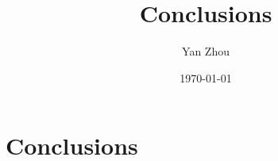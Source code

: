 \documentclass[11pt, hyper, bib, fontset=Minion]{marticle}
\title{Conclusions}
\author{Yan Zhou}
\date{\today}
\begin{document}
\maketitle

\else %

\chapter{Conclusions}
\label{cha:Conclusions}

\fi %


\ifx\inthesis\undefined
\printbibliography
\end{document}
